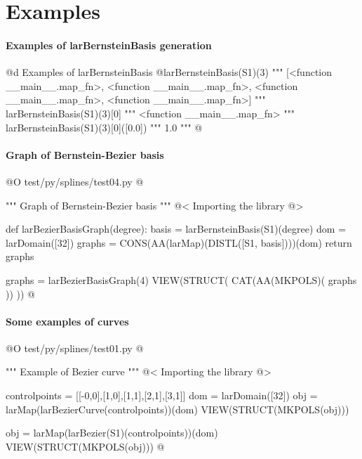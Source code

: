 \documentclass[11pt,oneside]{article}	%
\begin{document}
\section{Examples}

\paragraph{Examples of larBernsteinBasis generation}

@d Examples of larBernsteinBasis
@{larBernsteinBasis(S1)(3) 
""" [<function __main__.map_fn>,
	<function __main__.map_fn>,
	<function __main__.map_fn>,
	<function __main__.map_fn>] """
larBernsteinBasis(S1)(3)[0]
""" <function __main__.map_fn> """
larBernsteinBasis(S1)(3)[0]([0.0])
""" 1.0 """
@}

\paragraph{Graph of Bernstein-Bezier basis}

@O  test/py/splines/test04.py
@{""" Graph of Bernstein-Bezier basis """
@< Importing the library @>

def larBezierBasisGraph(degree):
	basis = larBernsteinBasis(S1)(degree)
	dom = larDomain([32])
	graphs = CONS(AA(larMap)(DISTL([S1, basis])))(dom)
	return graphs

graphs = larBezierBasisGraph(4)
VIEW(STRUCT( CAT(AA(MKPOLS)( graphs )) ))
@}


\paragraph{Some examples of curves}

@O test/py/splines/test01.py 
@{""" Example of Bezier curve """
@< Importing the library @>

controlpoints = [[-0,0],[1,0],[1,1],[2,1],[3,1]]
dom = larDomain([32])
obj = larMap(larBezierCurve(controlpoints))(dom)
VIEW(STRUCT(MKPOLS(obj)))

obj = larMap(larBezier(S1)(controlpoints))(dom)
VIEW(STRUCT(MKPOLS(obj)))
@}
\end{document}
